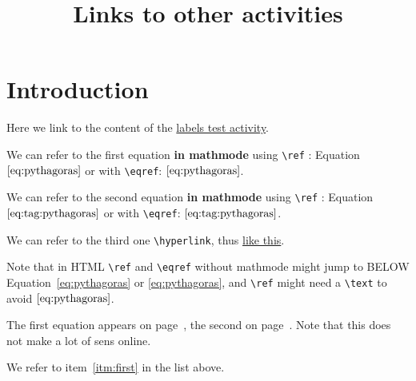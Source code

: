 \documentclass{ximera}
\title{Links to other activities}
\begin{document}
\begin{abstract}
\end{abstract}
\maketitle
\label{xim:labelsFromOtherActivity}

\section{Introduction}
\label{sec:intro} %
 
Here we link to the content of the \hyperlink{xim:labels}{labels test activity}.


We can refer to the first equation \textbf{in mathmode} using \verb|\ref| : Equation~$\ref{eq:pythagoras}$ or with \verb|\eqref|: $\eqref{eq:pythagoras}$.

We can refer to the second equation \textbf{in mathmode} using \verb|\ref| : Equation~$\text{\ref{eq:tag:pythagoras}}$ or with \verb|\eqref|: $\eqref{eq:tag:pythagoras}$.

We can refer to the third one  \verb|\hyperlink|, thus \hyperlink{ht:pythagoras}{like this}.

Note that in HTML \verb|\ref| and \verb|\eqref| without mathmode might jump to BELOW Equation~\ref{eq:pythagoras} or \eqref{eq:pythagoras}, and
\verb|\ref| might need a \verb|\text| to avoid $\ref{eq:pythagoras}$.

The first equation appears on page~\pageref{eq:pythagoras}, the second on page~\pageref{eq:tag:pythagoras}. 
Note that this does not make a lot of sens online.

We refer to item~\ref{itm:first} in the list above.

\
\end{document}

